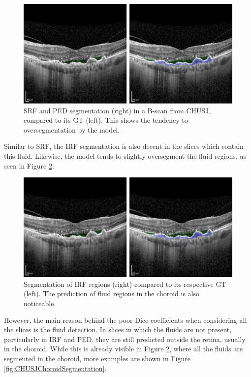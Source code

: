 \begin{figure}[!ht]
	\centering
	\includegraphics[width=0.9\linewidth]{figures/CHUSJSRFSegmentation.png}
	\caption{SRF and PED segmentation (right) in a B-scan from CHUSJ, compared to its GT (left). This shows the tendency to oversegmentation by the model.}
	\label{fig:CHUSJSRFSegmentation}
\end{figure}

Similar to SRF, the IRF segmentation is also decent in the slices which contain this fluid. Likewise, the model tends to slightly oversegment the fluid regions, as seen in Figure \ref{fig:CHUSJIRFSegmentation}. 

\begin{figure}[!ht]
	\centering
	\includegraphics[width=0.9\linewidth]{figures/CHUSJSRFSegmentation.png}
	\caption{Segmentation of IRF regions (right) compared to its respective GT (left). The prediction of fluid regions in the choroid is also noticeable.}
	\label{fig:CHUSJIRFSegmentation}
\end{figure}

However, the main reason behind the poor Dice coefficients when considering all the slices is the fluid detection. In slices in which the fluids are not present, particularly in IRF and PED, they are still predicted outside the retina, usually in the choroid. While this is already visible in Figure \ref{fig:CHUSJIRFSegmentation}, where all the fluids are segmented in the choroid, more examples are shown in Figure \ref{fig:CHUSJChoroidSegmentation}.

